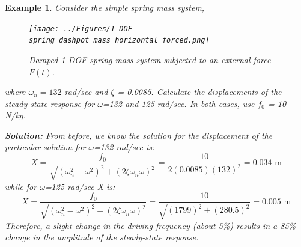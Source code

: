 \documentclass[12pt,letter]{article}
\newtheorem{ex}{Example}
\numberwithin{ex}{section} %
\newenvironment{example}{\begin{mdframed}[middlelinewidth=0.5mm]\begin{ex}\normalfont}{\end{ex}\end{mdframed}}
\numberwithin{re}{section} %
\begin{document}
			
			
\begin{example}

			Consider the simple spring mass system, 
			\begin{figure}[H]
				\centering
				\texttt{[image: ../Figures/1-DOF-spring\_dashpot\_mass\_horizontal\_forced.png]}
				\caption{Damped 1-DOF spring-mass system subjected to an external force $F(t)$.}
			\end{figure}				
			\noindent where $\omega_n = 132$ rad/sec and $\zeta$ = 0.0085. Calculate the displacements of the steady-state response for $\omega$=132 and 125 rad/sec. In both cases, use $f_0$ = 10 N/kg. 

			\noindent\textbf{Solution:}	From before, we know the solution for the displacement of the particular solution for $\omega$=132 rad/sec is:
			\begin{equation}
				X = \frac{f_0}{\sqrt{(\omega_n^2 - \omega^2)^2 +  (2\zeta \omega_n \omega)^2}} = \frac{10}{2(0.0085)(132)^2} = 0.034 \text{ m}
			\end{equation}							
			while for $\omega$=125 rad/sec X is:
			\begin{equation}
				X = \frac{f_0}{\sqrt{(\omega_n^2 - \omega^2)^2 +  (2\zeta \omega_n \omega)^2}} = \frac{10}{\sqrt{(1799)^2 +  (280.5)^2}}  = 0.005 \text{ m}
			\end{equation}				
			Therefore, a slight change in the driving frequency (about 5\%) results in a 85\% change in the amplitude of the steady-state response. 
\end{example}
\end{document}
